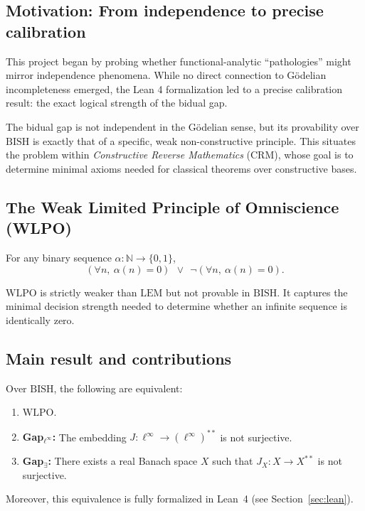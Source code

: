 \documentclass{lmcs}
\newcommand{\N}{\mathbb{N}}
\newcommand{\linf}{\ell^\infty}
\newcommand{\WLPO}{\mathrm{WLPO}}
\newcommand{\BISH}{\mathrm{BISH}}
\newcommand{\CRM}{\mathrm{CRM}}
\newcommand{\LEM}{\mathrm{LEM}}
\begin{document}
\subsection{Motivation: From independence to precise calibration}

This project began by probing whether functional-analytic ``pathologies'' might mirror independence phenomena. While no direct connection to G\"odelian incompleteness emerged, the Lean 4 formalization led to a precise calibration result: the exact logical strength of the bidual gap.

The bidual gap is not independent in the G\"odelian sense, but its provability over $\BISH$ is exactly that of a specific, weak non-constructive principle. This situates the problem within \emph{Constructive Reverse Mathematics} ($\CRM$), whose goal is to determine minimal axioms needed for classical theorems over constructive bases.

\subsection{The Weak Limited Principle of Omniscience (WLPO)}

\begin{defi}[$\WLPO$]
For any binary sequence $\alpha:\N\to\{0,1\}$,
\[
(\forall n,\ \alpha(n)=0)\ \ \vee\ \ \neg(\forall n,\ \alpha(n)=0).
\]
\end{defi}

$\WLPO$ is strictly weaker than $\LEM$ but not provable in $\BISH$. It captures the minimal decision strength needed to determine whether an infinite sequence is identically zero.

\subsection{Main result and contributions}

\begin{thm}
Over $\BISH$, the following are equivalent:
\begin{enumerate}
\item $\WLPO$.
\item \textbf{Gap$_{\linf}$:} The embedding $J:\linf\to(\linf)^{**}$ is not surjective.
\item \textbf{Gap$_{\exists}$:} There exists a real Banach space $X$ such that $J_X:X\to X^{**}$ is not surjective.
\end{enumerate}
Moreover, this equivalence is fully formalized in Lean~4 (see Section~\ref{sec:lean}).
\end{thm}
\end{document}
